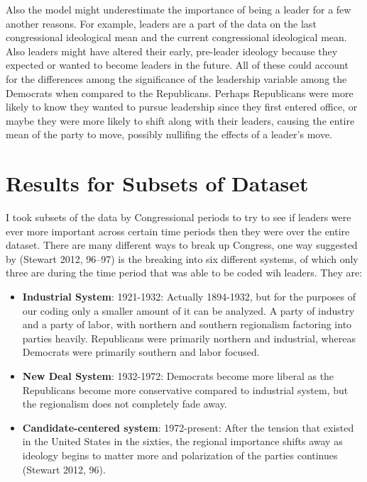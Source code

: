 \documentclass[12pt,twoside]{reedthesis}
\begin{document}
  Also the model might underestimate the importance of being a leader for
  a few another reasons. For example, leaders are a part of the data on
  the last congressional ideological mean and the current congressional
  ideological mean. Also leaders might have altered their early,
  pre-leader ideology because they expected or wanted to become leaders in
  the future. All of these could account for the differences among the
  significance of the leadership variable among the Democrats when
  compared to the Republicans. Perhaps Republicans were more likely to
  know they wanted to pursue leadership since they first entered office,
  or maybe they were more likely to shift along with their leaders,
  causing the entire mean of the party to move, possibly nullifing the
  effects of a leader's move.
  
  \section{Results for Subsets of
  Dataset}\label{results-for-subsets-of-dataset}
  
  I took subsets of the data by Congressional periods to try to see if
  leaders were ever more important across certain time periods then they
  were over the entire dataset. There are many different ways to break up
  Congress, one way suggested by (Stewart 2012, 96--97) is the breaking
  into six different systems, of which only three are during the time
  period that was able to be coded wih leaders. They are:
  
  \begin{itemize}
  \itemsep1pt\parskip0pt
  \item
    \textbf{Industrial System}: 1921-1932: Actually 1894-1932, but for the
    purposes of our coding only a smaller amount of it can be analyzed. A
    party of industry and a party of labor, with northern and southern
    regionalism factoring into parties heavily. Republicans were primarily
    northern and industrial, whereas Democrats were primarily southern and
    labor focused.
  \item
    \textbf{New Deal System}: 1932-1972: Democrats become more liberal as
    the Republicans become more conservative compared to industrial
    system, but the regionalism does not completely fade away.
  \item
    \textbf{Candidate-centered system}: 1972-present: After the tension
    that existed in the United States in the sixties, the regional
    importance shifts away as ideology begins to matter more and
    polarization of the parties continues (Stewart 2012, 96).
  \end{itemize}
  
\end{document}
